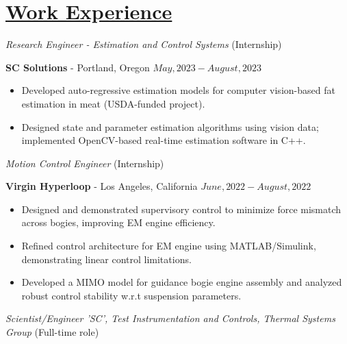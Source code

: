 \section*{\underline{Work Experience}}
\noindent\textit{Research Engineer  - Estimation and Control Systems} (Internship)

\textbf{SC Solutions} - Portland, Oregon \hfill $May, 2023 - August, 2023$

\begin{itemize}
    \item Developed auto-regressive estimation models for computer vision-based fat estimation in meat (USDA-funded project).
    \item Designed state and parameter estimation algorithms using vision data; implemented OpenCV-based real-time estimation software in C++.
\end{itemize}

\medskip

\noindent \textit{Motion Control Engineer } (Internship)

\textbf{Virgin Hyperloop} - Los Angeles, California \hfill $June, 2022  - August, 2022$

\begin{itemize}
        \item Designed and demonstrated supervisory control to minimize force mismatch across bogies, improving EM engine efficiency.
        \item Refined control architecture for EM engine using MATLAB/Simulink, demonstrating linear control limitations.
        \item Developed a MIMO model for guidance bogie engine assembly and analyzed robust control stability w.r.t suspension parameters.
\end{itemize}

\medskip

\noindent\textit{Scientist/Engineer 'SC', Test Instrumentation and Controls, Thermal Systems Group} (Full-time role)


